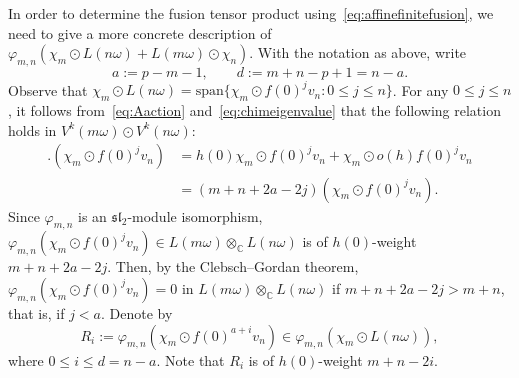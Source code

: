 \documentclass[12pt,a4paper,reqno]{amsart}
\numberwithin{equation}{section}
\theoremstyle{definition}
\renewcommand{\sl}{\mathfrak{sl}}
\newcommand{\C}{\mathbb{C}}
\def\spn{\mathrm{span}}
\def\om{\omega}
\def\o{\otimes}
\begin{document}
In order to determine the fusion tensor product using~\eqref{eq:affinefinitefusion}, we need to give a more concrete description of $\varphi_{m,n}(\chi_m\odot L(n\om)+L(m\om)\odot \chi_n )$. With the notation as above, write
\begin{equation}\label{eq:aandd}
  a:=p-m-1,\qquad  d:=m+n-p+1=n-a.
\end{equation}
Observe that $\chi_m\odot L(n\om)=\spn\{\chi_m\odot f(0)^jv_n:0\leq j\leq n\}$. For any $0\leq j\leq n$, it follows from~\eqref{eq:Aaction} and~\eqref{eq:chimeigenvalue} that the following relation holds in $V^k(m\om)\odot V^k(n\om)$:
\begin{align*}
    [h].(\chi_m\odot f(0)^jv_n)&=h(0)\chi_m\odot f(0)^jv_n+\chi_m\odot o(h)f(0)^jv_n\\
    &=(m+n+2a-2j) (\chi_m\odot f(0)^jv_n).
\end{align*}
Since $\varphi_{m,n}$ is an $\sl_2$-module isomorphism, $\varphi_{m,n}(\chi_m\odot f(0)^jv_n)\in L(m\om)\o_\C L(n\om)$ is of $h(0)$-weight $m+n+2a-2j$.
Then, by the Clebsch--Gordan theorem, $\varphi_{m,n}(\chi_m\odot f(0)^jv_n)=0$ in $L(m\om)\o_\C L(n\om)$ if $m+n+2a-2j>m+n$, that is, if $j<a$. Denote by
\begin{equation}\label{eq:defRi}
R_i:=\varphi_{m,n}(\chi_m\odot f(0)^{a+i}v_n)\in \varphi_{m,n}(\chi_m\odot L(n\om)),
\end{equation}
where $0\leq i\leq d=n-a$.  Note that $R_i$ is of $h(0)$-weight $m+n-2i$.
\end{document}
